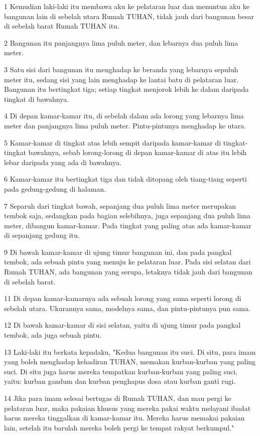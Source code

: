 \par 1 Kemudian laki-laki itu membawa aku ke pelataran luar dan menuntun aku ke bangunan lain di sebelah utara Rumah TUHAN, tidak jauh dari bangunan besar di sebelah barat Rumah TUHAN itu.
\par 2 Bangunan itu panjangnya lima puluh meter, dan lebarnya dua puluh lima meter.
\par 3 Satu sisi dari bangunan itu menghadap ke beranda yang lebarnya sepuluh meter itu, sedang sisi yang lain menghadap ke lantai batu di pelataran luar. Bangunan itu bertingkat tiga; setiap tingkat menjorok lebih ke dalam daripada tingkat di bawahnya.
\par 4 Di depan kamar-kamar itu, di sebelah dalam ada lorong yang lebarnya lima meter dan panjangnya lima puluh meter. Pintu-pintunya menghadap ke utara.
\par 5 Kamar-kamar di tingkat atas lebih sempit daripada kamar-kamar di tingkat-tingkat bawahnya, sebab lorong-lorong di depan kamar-kamar di atas itu lebih lebar daripada yang ada di bawahnya.
\par 6 Kamar-kamar itu bertingkat tiga dan tidak ditopang oleh tiang-tiang seperti pada gedung-gedung di halaman.
\par 7 Separuh dari tingkat bawah, sepanjang dua puluh lima meter merupakan tembok saja, sedangkan pada bagian selebihnya, juga sepanjang dua puluh lima meter, dibangun kamar-kamar. Pada tingkat yang paling atas ada kamar-kamar di sepanjang gedung itu.
\par 9 Di bawah kamar-kamar di ujung timur bangunan ini, dan pada pangkal tembok, ada sebuah pintu yang menuju ke pelataran luar. Pada sisi selatan dari Rumah TUHAN, ada bangunan yang serupa, letaknya tidak jauh dari bangunan di sebelah barat.
\par 11 Di depan kamar-kamarnya ada sebuah lorong yang sama seperti lorong di sebelah utara. Ukurannya sama, modelnya sama, dan pintu-pintunya pun sama.
\par 12 Di bawah kamar-kamar di sisi selatan, yaitu di ujung timur pada pangkal tembok, ada juga sebuah pintu.
\par 13 Laki-laki itu berkata kepadaku, "Kedua bangunan itu suci. Di situ, para imam yang boleh menghadap kehadiran TUHAN, memakan kurban-kurban yang paling suci. Di situ juga harus mereka tempatkan kurban-kurban yang paling suci, yaitu: kurban gandum dan kurban penghapus dosa atau kurban ganti rugi.
\par 14 Jika para imam selesai bertugas di Rumah TUHAN, dan mau pergi ke pelataran luar, maka pakaian khusus yang mereka pakai waktu melayani ibadat harus mereka tinggalkan di kamar-kamar itu. Mereka harus memakai pakaian lain, setelah itu barulah mereka boleh pergi ke tempat rakyat berkumpul."
